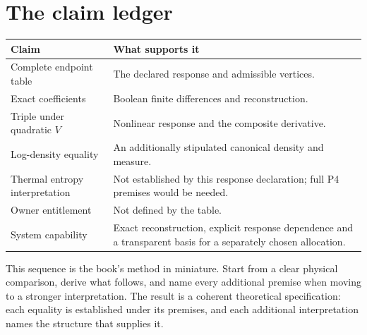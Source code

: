\section{The claim ledger}
\begin{longtable}{P{.36\linewidth}P{.54\linewidth}}
\toprule Claim & What supports it\\\midrule
Complete endpoint table & The declared response and admissible vertices.\\
Exact coefficients & Boolean finite differences and reconstruction.\\
Triple under quadratic $V$ & Nonlinear response and the composite derivative.\\
Log-density equality & An additionally stipulated canonical density and measure.\\
Thermal entropy interpretation & Not established by this response declaration; full P4 premises would be needed.\\
Owner entitlement & Not defined by the table.\\
System capability & Exact reconstruction, explicit response dependence and a transparent basis for a separately chosen allocation.\\
\bottomrule
\end{longtable}

This sequence is the book's method in miniature. Start from a clear physical comparison, derive what follows, and name every additional premise when moving to a stronger interpretation. The result is a coherent theoretical specification: each equality is established under its premises, and each additional interpretation names the structure that supplies it.
